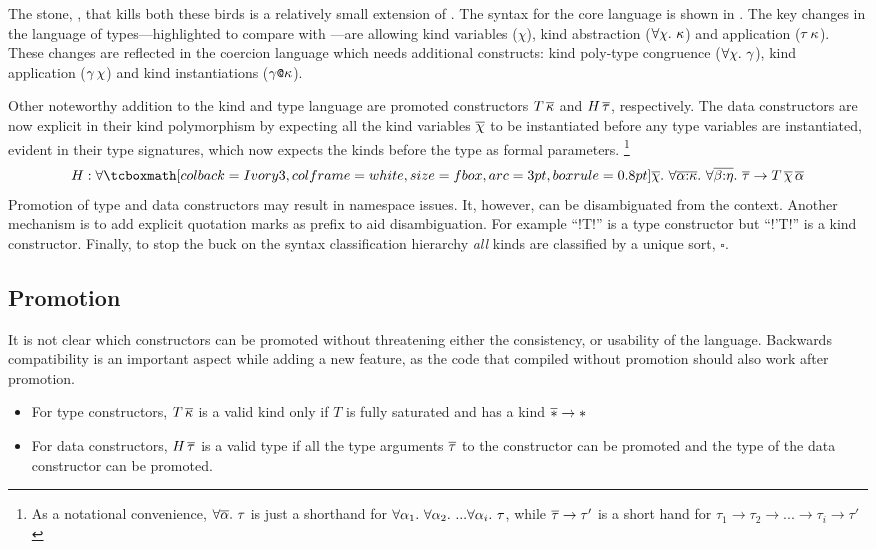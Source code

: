 \documentclass[manuscript,screen,nonacm]{acmart}
\begin{document}
The stone, \SFP, that kills both these birds is a relatively small extension of \SF. The syntax for the core language is shown in . The key changes in the language of types---highlighted to compare with \SFC---are allowing kind variables ($\chi$), kind abstraction ($\forall\chi.~\kappa$) and application ($\tau\, \kappa$). These changes are reflected in the coercion language which needs additional constructs: kind poly-type congruence ($\forall\chi.~\gamma$), kind application ($\gamma\,\chi$) and kind instantiations ($\gamma\texttt{@}\kappa$).

Other noteworthy addition to the kind and type language are promoted constructors $T\,\overline{\kappa}$ and $H\,\overline{\tau}$, respectively. The data constructors are now explicit in their kind polymorphism by expecting all the kind variables $\overline{\chi}$ to be instantiated before any type variables are instantiated, evident in their type signatures, which now expects the kinds before the type as formal parameters.
\footnote{As a notational convenience, $\forall\overline{\alpha}.~\tau$ is just a shorthand for $\forall\alpha_1.~\forall\alpha_2.~... \forall\alpha_i.~\tau$, while $\overline{\tau} \to \tau'$ is a short hand for $\tau_1 \to \tau_2 \to ... \to \tau_i \to \tau'$
}{$$ H : \Forall {\shl{\many\chi}} {\Forall {\many{\alpha\co\kappa}} {\Forall {\many{\beta\co\eta}} {\many\tau \to T \App\many{\chi}\App\many{\alpha}}}} $$
}
Promotion of type and data constructors may result in namespace issues. It, however, can be disambiguated from the context. Another mechanism is to add explicit quotation marks as prefix to aid disambiguation.
For example ``!T!'' is a type constructor but ``!'T!'' is a kind constructor.
Finally, to stop the buck on the syntax classification hierarchy \emph{all} kinds are classified by a unique sort, $\square$.


\subsection{Promotion}
It is not clear which constructors can be promoted without threatening either the consistency, or usability of the language. Backwards compatibility is an important aspect while adding a new feature, as the code that compiled without promotion should also work after promotion.

\begin{itemize}
\item For type constructors, $T\,\overline{\kappa}$ is a valid kind only if $T$ is fully saturated and has a kind $\overline{\ast} \to \ast$
\item For data constructors, $H\,\overline{\tau}$ is a valid type if all the type arguments $\overline{\tau}$ to the constructor can be promoted and the type of the data constructor can be promoted.
\end{itemize}
\end{document}
